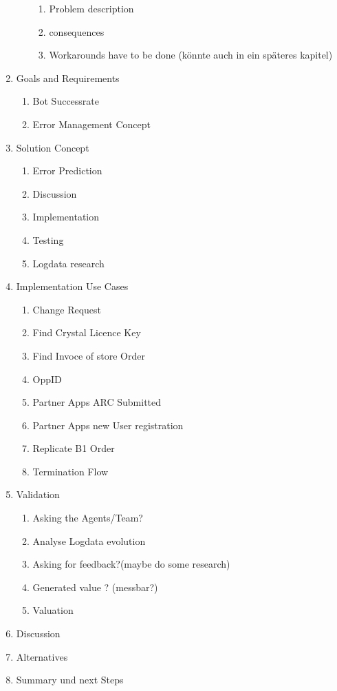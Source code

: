 \begin{enumerate}
\begin{enumerate}
\begin{enumerate}
            \item {Problem description}
            \item {consequences}
            \item {Workarounds have to be done (könnte auch in ein späteres kapitel)}
        \end{enumerate}
    \end{enumerate}
    \item {Goals and Requirements}
        \begin{enumerate}
            \item Bot Successrate
            \item Error Management Concept
        \end{enumerate}
    \item {Solution Concept}
        \begin{enumerate}
            \item Error Prediction
            \item Discussion
            \item Implementation
            \item Testing
            \item Logdata research
        \end{enumerate}
    \item {Implementation Use Cases}
        \begin{enumerate}
            \item Change Request
            \item Find Crystal Licence Key
            \item Find Invoce of store Order
            \item OppID
            \item Partner Apps ARC Submitted
            \item Partner Apps new User registration
            \item Replicate B1 Order
            \item Termination Flow
        \end{enumerate}
    \item {Validation}
    \begin{enumerate}
        \item Asking the Agents/Team?
        \item Analyse Logdata evolution
        \item Asking for feedback?(maybe do some research)
        \item Generated value ? (messbar?)
        \item Valuation
    \end{enumerate}
    \item {Discussion}
    \item {Alternatives}
    \item {Summary und next Steps}
\end{enumerate}

